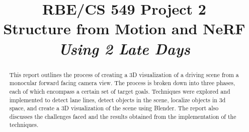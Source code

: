 \documentclass[conference]{IEEEtran}
\begin{document}
\title{
  RBE/CS 549 Project 2\\
   Structure from Motion and NeRF \\
  \vspace{0.3cm}
  \large{\textit{Using 2 Late Days}}
}

\author{
 \and
{}
}

\maketitle

\begin{abstract}
This report outlines the process of creating a 3D visualization of a driving scene from a monocular forward facing camera view. The process is broken down into three phases, each of which encompass a certain set of target goals. Techniques were explored and implemented to detect lane lines, detect objects in the scene, localize objects in 3d space, and create a 3D visualization of the scene using Blender. The report also discusses the challenges faced and the results obtained from the implementation of the techniques.
\end{abstract}









\printbibliography
\clearpage

\end{document}
